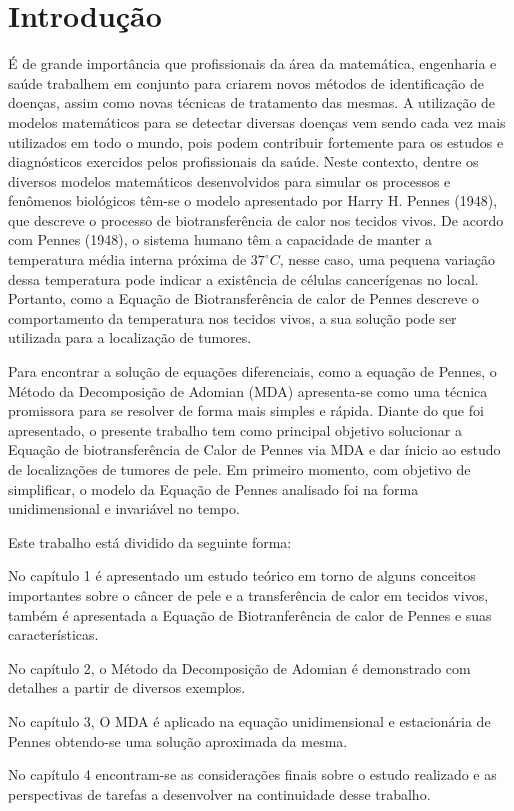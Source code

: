 \chapter*[Introdução]{Introdução}

É de grande importância que profissionais da área da matemática, engenharia e saúde trabalhem em conjunto para criarem novos métodos de identificação de doenças, assim como novas técnicas de  tratamento das mesmas. A utilização de modelos matemáticos para se detectar diversas doenças vem sendo cada vez mais utilizados em todo o mundo, pois podem contribuir fortemente para os estudos e diagnósticos exercidos pelos profissionais da saúde.
Neste contexto, dentre os diversos modelos matemáticos desenvolvidos para simular os processos e fenômenos biológicos têm-se o modelo apresentado por Harry H. Pennes (1948), que descreve o processo de biotransferência de calor nos tecidos vivos. 
De acordo com Pennes (1948), o sistema humano têm a capacidade de  manter a temperatura média interna próxima de $37^{\circ} C$, nesse caso, uma pequena variação dessa temperatura pode indicar a existência de células cancerígenas no local. Portanto, como a Equação de Biotransferência de calor de Pennes descreve o comportamento da temperatura nos tecidos vivos, a sua  solução pode ser utilizada para a  localização de  tumores.

  Para encontrar a solução de equações diferenciais, como a equação de Pennes, o Método da Decomposição de Adomian (MDA) apresenta-se como uma técnica promissora para se resolver de forma mais simples e rápida. Diante do que foi apresentado, o presente trabalho tem como principal objetivo solucionar a Equação de biotransferência de Calor de Pennes via MDA e dar ínicio ao estudo de localizações de tumores de pele. Em primeiro momento, com objetivo de simplificar, o modelo da Equação de Pennes analisado  foi na forma unidimensional e invariável no tempo.
  
  Este trabalho está dividido da seguinte forma:
   
   No capítulo 1 é apresentado um estudo teórico em torno de alguns conceitos importantes sobre o câncer de pele e a transferência de calor em tecidos vivos, também é apresentada a Equação de Biotranferência de calor de Pennes e suas características.
   
   No capítulo 2, o Método da Decomposição de Adomian é demonstrado com detalhes a partir de diversos exemplos.
   
   No capítulo 3, O MDA é aplicado na equação unidimensional e estacionária de Pennes obtendo-se uma solução aproximada da mesma.
   
   No capítulo 4 encontram-se as considerações finais sobre o estudo  realizado e as perspectivas de tarefas a desenvolver na continuidade desse trabalho.
  














